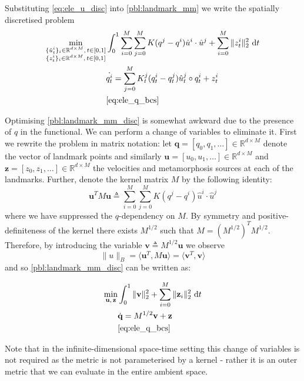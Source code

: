 \documentclass{article}
\newcommand{\norm}[2]{\| #1 \|_{ #2 }}
\newcommand{\bnorm}[1]{\norm{ #1 }{B}}
\newcommand{\ltwonorm}[1]{\norm{ #1 }{2}}
\newcommand{\diff}[1]{\text{d} #1}
\newcommand{\Q}{\mathbf{q}}
\newcommand{\U}{\mathbf{u}}
\newcommand{\Z}{\mathbf{z}}
\newcommand{\V}{\mathbf{v}}
\begin{document}
Substituting \eqref{eq:ele_u_disc} into
\eqref{pbl:landmark_mm} we write the spatially discretised problem
\begin{subequations}\label{pbl:landmark_mm_disc}
\begin{align}
\min_{\substack{\{\hat u^i_t\}_i \in \mathbb{R}^{d\times M},\, t\in[0,1]\\
\{z^i_t\}_i \in \mathbb{R}^{d\times M},\, t\in[0,1]}} & \int_0^1 \sum_{i=0}^M
\sum_{j=0}^M K(q^j-q^i)\hat u^i \cdot\hat u^j+ \sum_{i=0}^M
\ltwonorm{z^i_t}^2 \diff{t}\\
            & \dot{q^i_t} = \sum_{j=0}^M K^j_t(q^i_t-q^j_t)\hat u^j_t \circ
            q^i_t + z^i_t \label{eq:ele_q_disc} \\
            & \eqref{eq:ele_q_bcs}\nonumber
\end{align}
\end{subequations}

Optimising \eqref{pbl:landmark_mm_disc} is somewhat awkward due to the presence
of $q$ in the functional. We can perform a change of variables to eliminate it.
First we rewrite the problem in matrix notation: let $\Q = [q_0, q_1,
\ldots]\in\mathbb{R}^{d\times M}$ denote the vector of landmark points and
similarly $\U = [u_0, u_1, \ldots]\in\mathbb{R}^{d\times M}$ and $\Z = [z_0,
z_1, \ldots]\in\mathbb{R}^{d\times M}$ the velocities and metamorphosis sources
at each of the landmarks. Further, denote the kernel matrix $M$ by the following
identity:
\[
\U^T M \U \triangleq \sum_{i=0}^M \sum_{j=0}^M K(q^j-q^i)\hat u^i \cdot\hat u^j
\]
where we have suppressed the $q$-dependency on $M$. By symmetry and
positive-definiteness of the kernel there exists $M^{1/2}$ such that $M =
(M^{1/2})^T M^{1/2}$. Therefore, by introducing the variable $\V \triangleq
M^{1/2}\U$ we observe
\[
\bnorm{u} = \langle\U^T, M \U\rangle = \langle\V^T,\V\rangle
\]
and so \eqref{pbl:landmark_mm_disc} can be written as:

\begin{subequations}\label{pbl:landmark_mm_disc_matrix}
\begin{align}
\min_{\U,\, \Z} & \int_0^1 \ltwonorm{\V}^2 + \sum_{i=0}^M \ltwonorm{\Z_i}^2 \diff{t}\\
            & \dot{\Q} = M^{1/2} \V + \Z\label{eq:Q_eq}\\
            & \eqref{eq:ele_q_bcs}\nonumber
\end{align}
\end{subequations}

Note that in the infinite-dimensional space-time setting this change of
variables is not required as the metric is not parameterised by a kernel -
rather it is an outer metric that we can evaluate in the entire ambient space.\\
\end{document}
